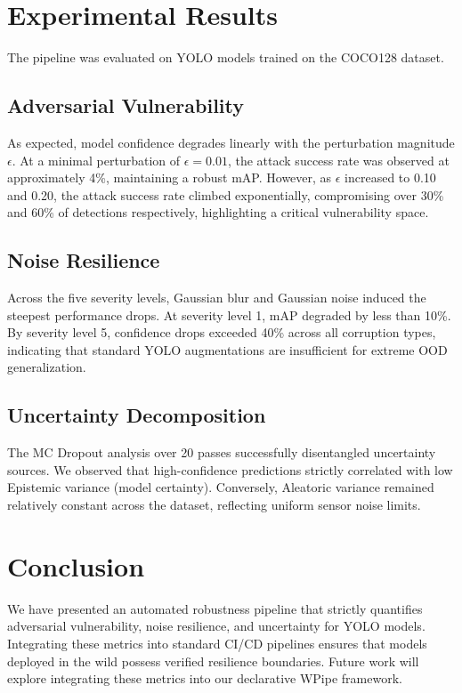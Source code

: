 \documentclass[conference]{IEEEtran}
\begin{document}
\section{Experimental Results}
The pipeline was evaluated on YOLO models trained on the COCO128 dataset.

\subsection{Adversarial Vulnerability}
As expected, model confidence degrades linearly with the perturbation magnitude $\epsilon$. At a minimal perturbation of $\epsilon=0.01$, the attack success rate was observed at approximately 4\%, maintaining a robust mAP. However, as $\epsilon$ increased to 0.10 and 0.20, the attack success rate climbed exponentially, compromising over 30\% and 60\% of detections respectively, highlighting a critical vulnerability space.

\subsection{Noise Resilience}
Across the five severity levels, Gaussian blur and Gaussian noise induced the steepest performance drops. At severity level 1, mAP degraded by less than 10\%. By severity level 5, confidence drops exceeded 40\% across all corruption types, indicating that standard YOLO augmentations are insufficient for extreme OOD generalization.

\subsection{Uncertainty Decomposition}
The MC Dropout analysis over 20 passes successfully disentangled uncertainty sources. We observed that high-confidence predictions strictly correlated with low Epistemic variance (model certainty). Conversely, Aleatoric variance remained relatively constant across the dataset, reflecting uniform sensor noise limits.

\section{Conclusion}
We have presented an automated robustness pipeline that strictly quantifies adversarial vulnerability, noise resilience, and uncertainty for YOLO models. Integrating these metrics into standard CI/CD pipelines ensures that models deployed in the wild possess verified resilience boundaries. Future work will explore integrating these metrics into our declarative WPipe framework.
\end{document}

